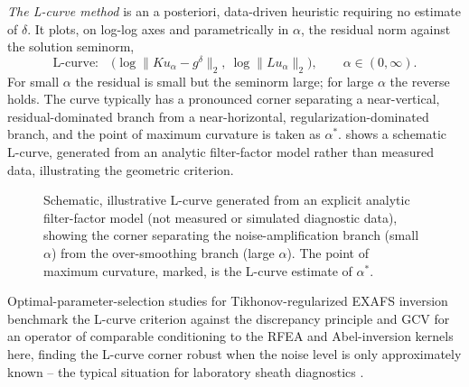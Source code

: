\emph{The L-curve method} is an a posteriori, data-driven heuristic requiring no estimate of $\delta$. It plots, on log-log axes and parametrically in $\alpha$, the residual norm against the solution seminorm,
\begin{equation}
\text{L-curve:} \quad \Big( \log \| K u_{\alpha} - g^{\delta} \|_{2},\ \log \| L u_{\alpha} \|_{2} \Big), \qquad \alpha \in (0, \infty).
\label{eq:l-curve-def}
\end{equation}
For small $\alpha$ the residual is small but the seminorm large; for large $\alpha$ the reverse holds. The curve typically has a pronounced corner separating a near-vertical, residual-dominated branch from a near-horizontal, regularization-dominated branch, and the point of maximum curvature is taken as $\alpha^{\ast}$.  shows a schematic L-curve, generated from an analytic filter-factor model rather than measured data, illustrating the geometric criterion.

\begin{figure}[htbp]
\centering
{}
\caption{Schematic, illustrative L-curve generated from an explicit analytic filter-factor model (not measured or simulated diagnostic data), showing the corner separating the noise-amplification branch (small $\alpha$) from the over-smoothing branch (large $\alpha$). The point of maximum curvature, marked, is the L-curve estimate of $\alpha^{\ast}$.}
\label{ch14-fig:lcurve}
\end{figure}

Optimal-parameter-selection studies for Tikhonov-regularized EXAFS inversion benchmark the L-curve criterion against the discrepancy principle and GCV for an operator of comparable conditioning to the RFEA and Abel-inversion kernels here, finding the L-curve corner robust when the noise level is only approximately known -- the typical situation for laboratory sheath diagnostics \cite{ref0695}.

